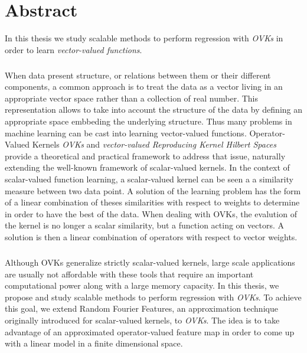 



\begingroup
\let\clearpage\relax
\let\cleardoublepage\relax
\let\cleardoublepage\relax

\chapter*{Abstract}
In this thesis we study scalable methods to perform regression with
\emph{\acl{OVK}s} in order to learn \emph{vector-valued functions}.
\paragraph{}
When data present structure, or relations between them or their different
components, a common approach is to treat the data as a vector living in an
appropriate vector space rather than a collection of real number. This
representation allows to take into account the structure of the data by
defining an appropriate space embbeding the underlying structure. Thus many
problems in machine learning can be cast into learning vector-valued functions.
Operator-Valued Kernels \emph{\acl{OVK}s} and \emph{vector-valued Reproducing
Kernel Hilbert Spaces} provide a theoretical and practical framework to address
that issue, naturally extending the well-known framework of scalar-valued
kernels. In the context of scalar-valued function learning, a scalar-valued
kernel can be seen a a similarity measure between two data point. A solution of
the learning problem has the form of a linear combination of theses
similarities with respect to weights to determine in order to have the best
 of the data. When dealing with \acl{OVK}s, the evalution of the
kernel is no longer a scalar similarity, but a function acting on vectors. A
solution is then a linear combination of operators with respect to vector
weights.
\paragraph{} 
Although \acl{OVK}s generalize strictly scalar-valued kernels,
large scale applications are usually not affordable with these tools that
require an important computational power along with a large memory capacity. In
this thesis, we propose and study scalable methods to perform regression with
\emph{\acl{OVK}s}. To achieve this goal, we extend Random Fourier Features, an
approximation technique originally introduced for scalar-valued kernels, to
\emph{\acl{OVK}s}. The idea is to take advantage of an approximated
operator-valued feature map in order to come up with a linear model in a finite
dimensional space.
